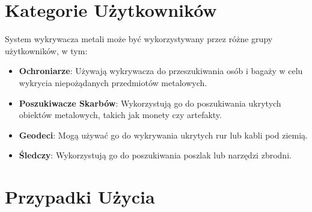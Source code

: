 \documentclass{article}
\begin{document}
\section{Kategorie Użytkowników}
System wykrywacza metali może być wykorzystywany przez różne grupy użytkowników, w tym:
\begin{itemize}
    \item \textbf{Ochroniarze}: Używają wykrywacza do przeszukiwania osób i bagaży w celu wykrycia niepożądanych przedmiotów metalowych.
    \item \textbf{Poszukiwacze Skarbów}: Wykorzystują go do poszukiwania ukrytych obiektów metalowych, takich jak monety czy artefakty.
    \item \textbf{Geodeci}: Mogą używać go do wykrywania ukrytych rur lub kabli pod ziemią.
    \item\textbf{Śledczy}: Wykorzystują go do poszukiwania poszlak lub narzędzi zbrodni.
\end{itemize}

\section{Przypadki Użycia}
\end{document}
